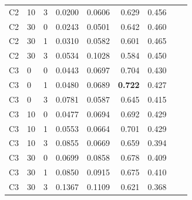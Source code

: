 \documentclass[pdflatex,sn-mathphys-num]{sn-jnl}%
\theoremstyle{thmstyleone}%
\theoremstyle{thmstyletwo}%
\theoremstyle{thmstylethree}%
\begin{document}
\begin{appendices}
\begin{table}
\begin{tabular}{llrrrrrrr}
C2 & 10 & 3 & 0.0200 & 0.0606 & 0.629 & 0.456 \\
C2 & 30 & 0 & 0.0243 & 0.0501 & 0.642 & 0.460 \\
C2 & 30 & 1 & 0.0310 & 0.0582 & 0.601 & 0.465 \\
C2 & 30 & 3 & 0.0534 & 0.1028 & 0.584 & 0.450 \\
\addlinespace[4pt]
C3 & 0 & 0 & 0.0443 & 0.0697 & 0.704 & 0.430 \\
C3 & 0 & 1 & 0.0480 & 0.0689 & \textbf{0.722} & 0.427 \\
C3 & 0 & 3 & 0.0781 & 0.0587 & 0.645 & 0.415 \\
C3 & 10 & 0 & 0.0477 & 0.0694 & 0.692 & 0.429 \\
C3 & 10 & 1 & 0.0553 & 0.0664 & 0.701 & 0.429 \\
C3 & 10 & 3 & 0.0855 & 0.0669 & 0.659 & 0.394 \\
C3 & 30 & 0 & 0.0699 & 0.0858 & 0.678 & 0.409 \\
C3 & 30 & 1 & 0.0850 & 0.0915 & 0.675 & 0.410 \\
C3 & 30 & 3 & 0.1367 & 0.1109 & 0.621 & 0.368 \\
\bottomrule
\end{tabular}
\end{table}


\end{appendices}
\end{document}
